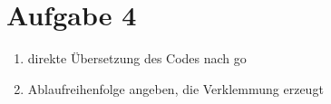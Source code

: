 \documentclass[11pt,a4paper,DIV=10,]{scrartcl}
\begin{document}
\section*{Aufgabe 4}
\begin{enumerate}
 \item direkte Übersetzung des Codes nach go 
 
 
 \item Ablaufreihenfolge angeben, die Verklemmung erzeugt \\
 
\end{enumerate}


\end{document}
